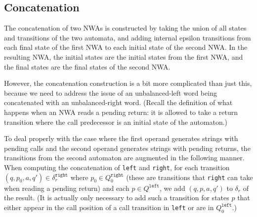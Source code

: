 \subsection{Concatenation}
\label{Se:Concatenation}

The concatenation of two NWAs is constructed by taking the union of all
states and transitions of the two automata, and adding
internal epsilon transitions from each final state of the first NWA to each
initial state of the second NWA.  In the resulting NWA, the initial states
are the initial states from the first NWA, and the final states are the final
states of the second NWA.

However, the concatenation construction is a bit more complicated than just this,
because we need to address the issue of an unbalanced-left
word being concatenated with an unbalanced-right word.  (Recall the
definition of what happens when an NWA reads a pending return: it is
allowed to take a return transition where the call predecessor is an initial
state of the automaton.) 

To deal properly with the case where the first operand generates strings with
pending calls and the second operand generates strings with pending returns,
the
transitions from the second automaton are augmented in the
following manner. When computing the concatenation of \texttt{left} and
\texttt{right}, for each transition $(q, p_0, a, q')
\in\delta_r^{\texttt{right}}$ where $p_0 \in Q_0^\texttt{right}$ (these are
transitions that \texttt{right} can take when reading a pending return) and
each $p \in Q^\texttt{left}$, we add $(q, p, a, q')$ to $\delta_r$ of the
result. (It is actually only necessary to add such a transition for states
$p$ that either appear in the call position of a call transition in
\texttt{left} or are in $Q_0^\texttt{left}$.)



